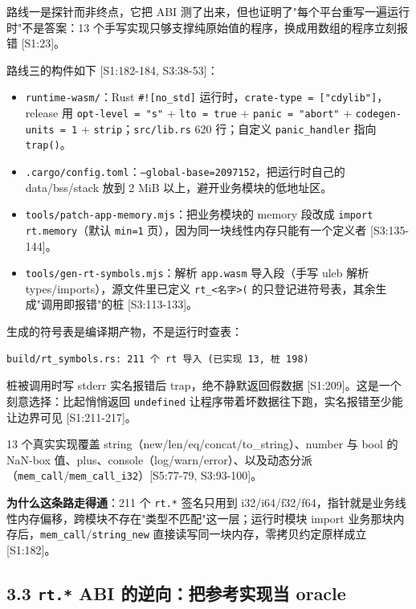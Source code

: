 \documentclass[11pt, a4paper]{article}
\begin{document}
路线一是探针而非终点，它把 ABI 测了出来，但也证明了"每个平台重写一遍运行时"不是答案：13 个手写实现只够支撑纯原始值的程序，换成用数组的程序立刻报错 [S1:23]。


路线三的构件如下 [S1:182-184, S3:38-53]：


\begin{itemize}
\item \texttt{runtime-wasm/}：Rust \texttt{\#![no\_std]} 运行时，\texttt{crate-type = ["cdylib"]}，release 用 \texttt{opt-level = "s"} + \texttt{lto = true} + \texttt{panic = "abort"} + \texttt{codegen-units = 1} + \texttt{strip}；\texttt{src/lib.rs} 620 行；自定义 \texttt{panic\_handler} 指向 \texttt{trap()}。
\item \texttt{.cargo/config.toml}：\texttt{--global-base=2097152}，把运行时自己的 data/bss/stack 放到 2 MiB 以上，避开业务模块的低地址区。
\item \texttt{tools/patch-app-memory.mjs}：把业务模块的 memory 段改成 \texttt{import rt.memory}（默认 \texttt{min=1} 页），因为同一块线性内存只能有一个定义者 [S3:135-144]。
\item \texttt{tools/gen-rt-symbols.mjs}：解析 \texttt{app.wasm} 导入段（手写 uleb 解析 types/imports），源文件里已定义 \texttt{rt\_<名字>(} 的只登记进符号表，其余生成"调用即报错"的桩 [S3:113-133]。
\end{itemize}

生成的符号表是编译期产物，不是运行时查表：


\begin{verbatim}
build/rt_symbols.rs: 211 个 rt 导入 (已实现 13, 桩 198)
\end{verbatim}

桩被调用时写 stderr 实名报错后 trap，绝不静默返回假数据 [S1:209]。这是一个刻意选择：比起悄悄返回 \texttt{undefined} 让程序带着坏数据往下跑，实名报错至少能让边界可见 [S1:211-217]。


13 个真实实现覆盖 string（new/len/eq/concat/to\_string）、number 与 bool 的 NaN-box 值、plus、console（log/warn/error）、以及动态分派（\texttt{mem\_call}/\texttt{mem\_call\_i32}）[S5:77-79, S3:93-100]。


\textbf{为什么这条路走得通}：211 个 \texttt{rt.*} 签名只用到 i32/i64/f32/f64，指针就是业务线性内存偏移，跨模块不存在"类型不匹配"这一层；运行时模块 import 业务那块内存后，\texttt{mem\_call}/\texttt{string\_new} 直接读写同一块内存，零拷贝约定原样成立 [S1:182]。


\subsection{3.3 \texttt{rt.*} ABI 的逆向：把参考实现当 oracle}
\end{document}

